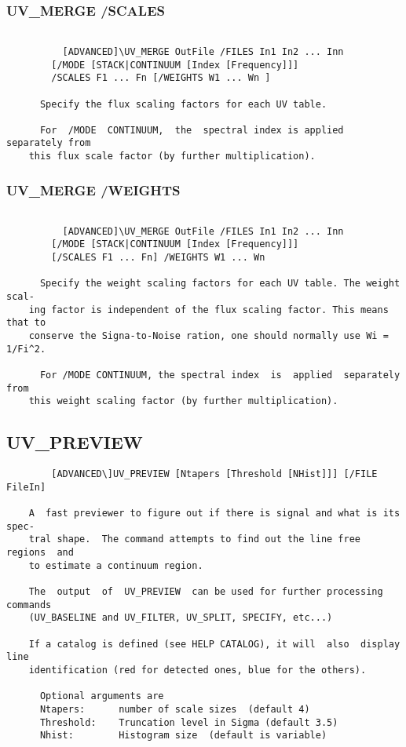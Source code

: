 \subsubsection{UV\_MERGE /SCALES}
\begin{verbatim}

          [ADVANCED]\UV_MERGE OutFile /FILES In1 In2 ... Inn
        [/MODE [STACK|CONTINUUM [Index [Frequency]]]
        /SCALES F1 ... Fn [/WEIGHTS W1 ... Wn ]

      Specify the flux scaling factors for each UV table.

      For  /MODE  CONTINUUM,  the  spectral index is applied separately from
    this flux scale factor (by further multiplication).

\end{verbatim}
\subsubsection{UV\_MERGE /WEIGHTS}
\begin{verbatim}

          [ADVANCED]\UV_MERGE OutFile /FILES In1 In2 ... Inn
        [/MODE [STACK|CONTINUUM [Index [Frequency]]]
        [/SCALES F1 ... Fn] /WEIGHTS W1 ... Wn

      Specify the weight scaling factors for each UV table. The weight scal-
    ing factor is independent of the flux scaling factor. This means that to
    conserve the Signa-to-Noise ration, one should normally use Wi = 1/Fi^2.

      For /MODE CONTINUUM, the spectral index  is  applied  separately  from
    this weight scaling factor (by further multiplication).

\end{verbatim}
\subsection{UV\_PREVIEW}
\begin{verbatim}
        [ADVANCED\]UV_PREVIEW [Ntapers [Threshold [NHist]]] [/FILE FileIn]

    A  fast previewer to figure out if there is signal and what is its spec-
    tral shape.  The command attempts to find out the line free regions  and
    to estimate a continuum region.

    The  output  of  UV_PREVIEW  can be used for further processing commands
    (UV_BASELINE and UV_FILTER, UV_SPLIT, SPECIFY, etc...)

    If a catalog is defined (see HELP CATALOG), it will  also  display  line
    identification (red for detected ones, blue for the others).

      Optional arguments are
      Ntapers:      number of scale sizes  (default 4)
      Threshold:    Truncation level in Sigma (default 3.5)
      Nhist:        Histogram size  (default is variable)

\end{verbatim}
